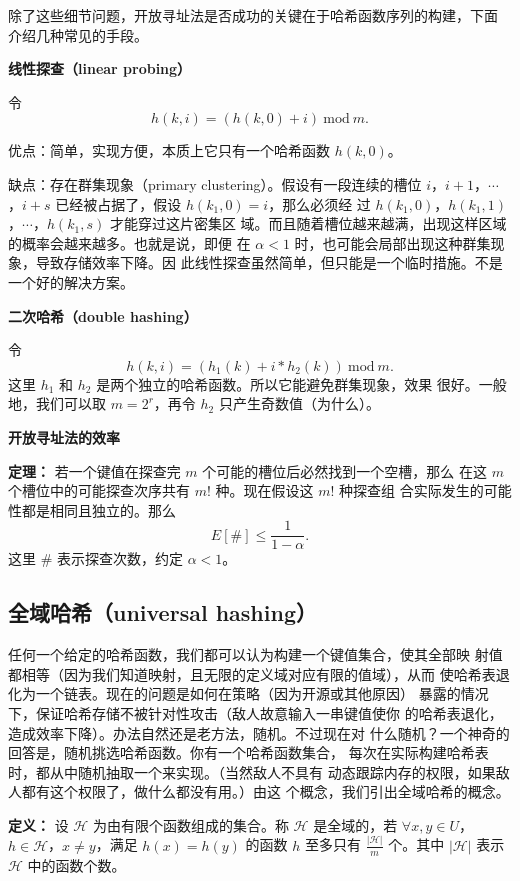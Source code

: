 \documentclass[a4paper]{ctexart}
\theoremstyle{definition}
\theoremstyle{definition}
\begin{document}
除了这些细节问题，开放寻址法是否成功的关键在于哈希函数序列的构建，下面
介绍几种常见的手段。

{\bf 线性探查（linear probing）}

令
$$
h(k, i) = (h(k, 0) + i) ~ \mathrm{mod} ~ m.
$$

优点：简单，实现方便，本质上它只有一个哈希函数 $h(k, 0)$。

缺点：存在群集现象（primary clustering）。假设有一段连续的槽位 $i$，$i
+ 1$，$\cdots$，$i + s$ 已经被占据了，假设 $h(k_1, 0) = i$，那么必须经
过 $h(k_1, 0)$，$h(k_1, 1)$，$\cdots$，$h(k_1, s)$ 才能穿过这片密集区
域。而且随着槽位越来越满，出现这样区域的概率会越来越多。也就是说，即便
在 $\alpha < 1$ 时，也可能会局部出现这种群集现象，导致存储效率下降。因
此线性探查虽然简单，但只能是一个临时措施。不是一个好的解决方案。

{\bf 二次哈希（double hashing）}

令
$$
h(k, i) = (h_1(k) + i * h_2(k))~\mathrm{mod}~m.
$$
这里 $h_1$ 和 $h_2$ 是两个独立的哈希函数。所以它能避免群集现象，效果
很好。一般地，我们可以取 $m = 2^r$，再令 $h_2$ 只产生奇数值（为什么）。

{\bf 开放寻址法的效率}

{\bf 定理：} 若一个键值在探查完 $m$ 个可能的槽位后必然找到一个空槽，那么
在这 $m$ 个槽位中的可能探查次序共有 $m!$ 种。现在假设这 $m!$ 种探查组
合实际发生的可能性都是相同且独立的。那么
$$
E[\#] \leq \frac{1}{1 - \alpha}.
$$
这里 $\#$ 表示探查次数，约定 $\alpha < 1$。


\subsection{全域哈希（universal hashing）}

任何一个给定的哈希函数，我们都可以认为构建一个键值集合，使其全部映
射值都相等（因为我们知道映射，且无限的定义域对应有限的值域），从而
使哈希表退化为一个链表。现在的问题是如何在策略（因为开源或其他原因）
暴露的情况下，保证哈希存储不被针对性攻击（敌人故意输入一串键值使你
的哈希表退化，造成效率下降）。办法自然还是老方法，随机。不过现在对
什么随机？一个神奇的回答是，随机挑选哈希函数。你有一个哈希函数集合，
每次在实际构建哈希表时，都从中随机抽取一个来实现。（当然敌人不具有
动态跟踪内存的权限，如果敌人都有这个权限了，做什么都没有用。）由这
个概念，我们引出全域哈希的概念。

{\bf 定义：} 设 $\mathscr{H}$ 为由有限个函数组成的集合。称
$\mathscr{H}$ 是全域的，若 $\forall x, y \in U$，$h \in
\mathscr{H}$，$x \neq y$，满足 $h(x) = h(y)$ 的函数 $h$
至多只有 $\frac{|\mathscr{H}|}{m}$ 个。其中
$|\mathscr{H}|$ 表示 $\mathscr{H}$ 中的函数个数。
\end{document}
